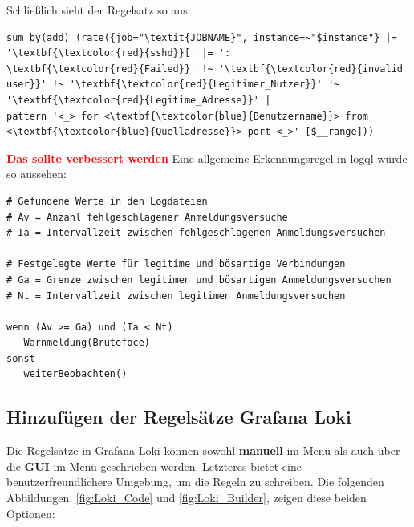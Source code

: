 Schließlich sieht der Regelsatz so aus:

{
\begin{Verbatim}[fontsize=\small, commandchars=\\\{\}, frame=single]
sum by(add) (rate({job="\textit{JOBNAME}", instance=~"$instance"} |= '\textbf{\textcolor{red}{sshd}}[' |= ': 
\textbf{\textcolor{red}{Failed}}' !~ '\textbf{\textcolor{red}{invalid user}}' !~ '\textbf{\textcolor{red}{Legitimer_Nutzer}}' !~ '\textbf{\textcolor{red}{Legitime_Adresse}}' |
pattern '<_> for <\textbf{\textcolor{blue}{Benutzername}}> from  <\textbf{\textcolor{blue}{Quelladresse}}> port <_>' [$__range]))
\end{Verbatim}
}




\textbf{\textcolor{red}{Das sollte verbessert werden}}
Eine allgemeine Erkennungsregel in \gls{logql} würde so aussehen:
{
\begin{Verbatim}[frame=single]
# Gefundene Werte in den Logdateien
# Av = Anzahl fehlgeschlagener Anmeldungsversuche
# Ia = Intervallzeit zwischen fehlgeschlagenen Anmeldungsversuchen

# Festgelegte Werte für legitime und bösartige Verbindungen
# Ga = Grenze zwischen legitimen und bösartigen Anmeldungsversuchen
# Nt = Intervallzeit zwischen legitimen Anmeldungsversuchen

wenn (Av >= Ga) und (Ia < Nt)
   Warnmeldung(Brutefoce)
sonst
   weiterBeobachten()
\end{Verbatim}
}

\subsection{Hinzufügen der Regelsätze Grafana Loki}
Die Regelsätze in Grafana Loki können sowohl \textbf{manuell} im Menü  als auch über die \textbf{\gls{GUI}} im Menü  geschrieben werden. Letzteres bietet eine benutzerfreundlichere Umgebung, um die Regeln zu schreiben. Die folgenden Abbildungen, \ref{fig:Loki_Code} und \ref{fig:Loki_Builder}, zeigen diese beiden Optionen:

